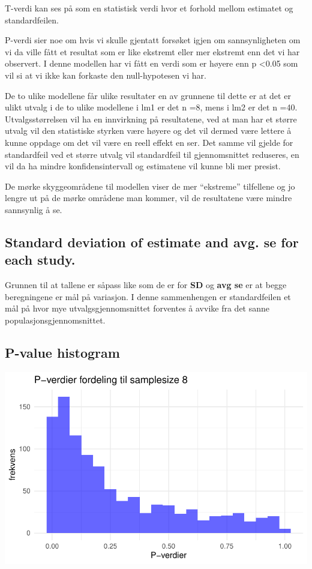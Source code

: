 \documentclass[
  letterpaper,
  DIV=11,
  numbers=noendperiod]{scrreprt}
\begin{document}
T-verdi kan ses på som en statistisk verdi hvor et forhold mellom
estimatet og standardfeilen.

P-verdi sier noe om hvis vi skulle gjentatt forsøket igjen om
sannsynligheten om vi da ville fått et resultat som er like ekstremt
eller mer ekstremt enn det vi har observert. I denne modellen har vi
fått en verdi som er høyere enn p \textless0.05 som vil si at vi ikke
kan forkaste den null-hypotesen vi har.

De to ulike modellene får ulike resultater en av grunnene til dette er
at det er ulikt utvalg i de to ulike modellene i lm1 er det n =8, mens i
lm2 er det n =40. Utvalgsstørrelsen vil ha en innvirkning på
resultatene, ved at man har et større utvalg vil den statistiske styrken
være høyere og det vil dermed være lettere å kunne oppdage om det vil
være en reell effekt en ser. Det samme vil gjelde for standardfeil ved
et større utvalg vil standardfeil til gjennomsnittet reduseres, en vil
da ha mindre konfidensintervall og estimatene vil kunne bli mer presist.

De mørke skyggeområdene til modellen viser de mer ``ekstreme''
tilfellene og jo lengre ut på de mørke områdene man kommer, vil de
resultatene være mindre sannsynlig å se.

\subsection{\texorpdfstring{Standard deviation of \textbf{estimate} and
avg. \textbf{se} for each
study.}{Standard deviation of estimate and avg. se for each study.}}\label{standard-deviation-of-estimate-and-avg.-se-for-each-study.}

Grunnen til at tallene er såpass like som de er for \textbf{SD} og
\textbf{avg se} er at begge beregningene er mål på variasjon. I denne
sammenhengen er standardfeilen et mål på hvor mye utvalgsgjennomsnittet
forventes å avvike fra det sanne populasjonsgjennomsnittet.

\subsection{P-value histogram}\label{p-value-histogram}

\includegraphics{03-statistical-inference_files/figure-pdf/P-verdi histogram SS8-1.pdf}
\end{document}
